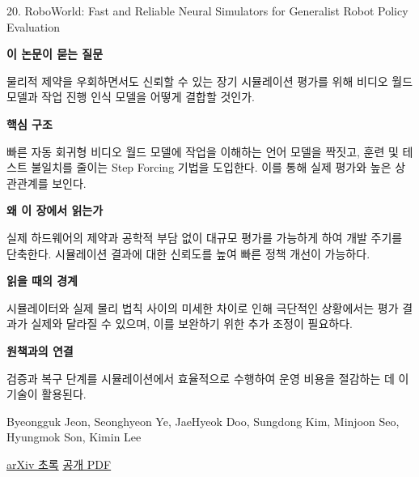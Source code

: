 \documentclass[11pt,openany]{book}
\begin{document}
\begin{termcard}{20. RoboWorld: Fast and Reliable Neural Simulators for Generalist Robot Policy Evaluation}

\par

\medskip

{\sffamily\bfseries\color{deepblue} 이 논문이 묻는 질문}\par

물리적 제약을 우회하면서도 신뢰할 수 있는 장기 시뮬레이션 평가를 위해 비디오 월드 모델과 작업 진행 인식 모델을 어떻게 결합할 것인가.

\smallskip

{\sffamily\bfseries\color{deepblue} 핵심 구조}\par

빠른 자동 회귀형 비디오 월드 모델에 작업을 이해하는 언어 모델을 짝짓고, 훈련 및 테스트 불일치를 줄이는 Step Forcing 기법을 도입한다. 이를 통해 실제 평가와 높은 상관관계를 보인다.

\smallskip

{\sffamily\bfseries\color{deepblue} 왜 이 장에서 읽는가}\par

실제 하드웨어의 제약과 공학적 부담 없이 대규모 평가를 가능하게 하여 개발 주기를 단축한다. 시뮬레이션 결과에 대한 신뢰도를 높여 빠른 정책 개선이 가능하다.

\smallskip

{\sffamily\bfseries\color{coral} 읽을 때의 경계}\par

시뮬레이터와 실제 물리 법칙 사이의 미세한 차이로 인해 극단적인 상황에서는 평가 결과가 실제와 달라질 수 있으며, 이를 보완하기 위한 추가 조정이 필요하다.

\smallskip

{\sffamily\bfseries\color{teal} 원책과의 연결}\par

검증과 복구 단계를 시뮬레이션에서 효율적으로 수행하여 운영 비용을 절감하는 데 이 기술이 활용된다.

\medskip

{\footnotesize\color{muted} Byeongguk Jeon, Seonghyeon Ye, JaeHyeok Doo, Sungdong Kim, Minjoon Seo, Hyungmok Son, Kimin Lee\par

\href{https://arxiv.org/abs/2607.01060}{arXiv 초록} \quad \href{https://arxiv.org/pdf/2607.01060}{공개 PDF}\par}

\end{termcard}
\end{document}
